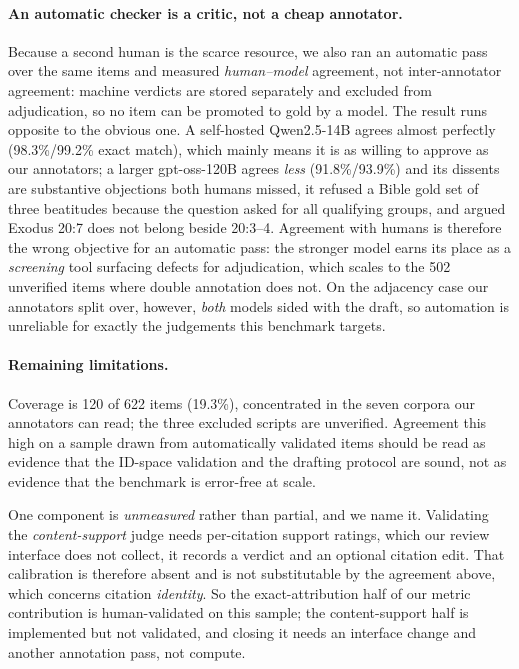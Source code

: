 \documentclass[11pt]{article}
\begin{document}
\paragraph{An automatic checker is a critic, not a cheap annotator.} Because a
second human is the scarce resource, we also ran an automatic pass over the same
items and measured \emph{human--model} agreement, not inter-annotator
agreement: machine verdicts are stored separately and excluded from
adjudication, so no item can be promoted to gold by a model. The result runs
opposite to the obvious one. A self-hosted Qwen2.5-14B agrees almost perfectly
(98.3\%/99.2\% exact match), which mainly means it is as willing to approve as
our annotators; a larger gpt-oss-120B agrees \emph{less} (91.8\%/93.9\%) and its
dissents are substantive objections both humans missed, it refused a Bible gold
set of three beatitudes because the question asked for all qualifying groups,
and argued Exodus 20:7 does not belong beside 20:3--4. Agreement with humans is
therefore the wrong objective for an automatic pass: the stronger model earns
its place as a \emph{screening} tool surfacing defects for adjudication, which
scales to the 502 unverified items where double annotation does not. On the
adjacency case our annotators split over, however, \emph{both} models sided with
the draft, so automation is unreliable for exactly the judgements this
benchmark targets.

\paragraph{Remaining limitations.} Coverage is 120 of 622 items (19.3\%),
concentrated in the seven corpora our annotators can read; the three excluded
scripts are unverified. Agreement this high on a sample drawn from
automatically validated items should be read as evidence that the ID-space
validation and the drafting protocol are sound, not as evidence that the
benchmark is error-free at scale.

One component is \emph{unmeasured} rather than partial, and we name it.
Validating the \emph{content-support} judge needs per-citation support ratings,
which our review interface does not collect, it records a verdict and an
optional citation edit. That calibration is therefore absent and is not
substitutable by the agreement above, which concerns citation \emph{identity}.
So the exact-attribution half of our metric contribution is human-validated on
this sample; the content-support half is implemented but not validated, and
closing it needs an interface change and another annotation pass, not compute.
\end{document}
